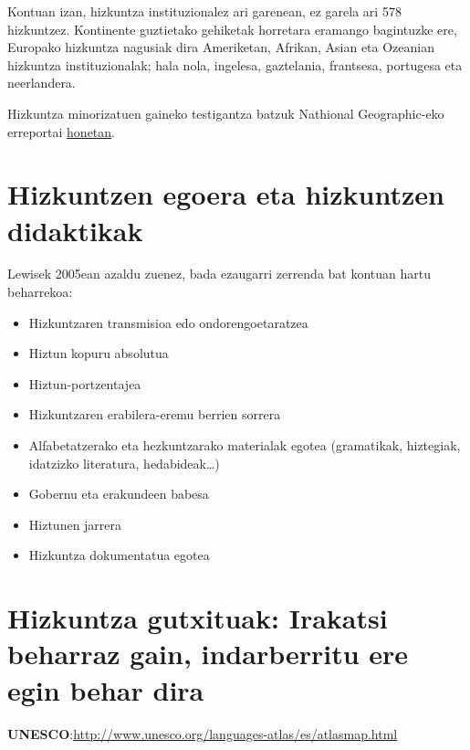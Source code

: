 \documentclass[
]{book}
\providecommand{\tightlist}{%
  \setlength{\itemsep}{0pt}\setlength{\parskip}{0pt}}
\begin{document}
Kontuan izan, hizkuntza instituzionalez ari garenean, ez garela ari 578 hizkuntzez. Kontinente guztietako gehiketak horretara eramango bagintuzke ere, Europako hizkuntza nagusiak dira Ameriketan, Afrikan, Asian eta Ozeanian hizkuntza instituzionalak; hala nola, ingelesa, gaztelania, frantsesa, portugesa eta neerlandera.

Hizkuntza minorizatuen gaineko testigantza batzuk Nathional Geographic-eko erreportai \href{http://www.nationalgeographic.com.es/mundo-ng/grandes-reportajes/lenguas-peligro-extincion_6174/26}{honetan}.

\hypertarget{hizkuntzen-egoera-eta-hizkuntzen-didaktikak}{%
\section{Hizkuntzen egoera eta hizkuntzen didaktikak}\label{hizkuntzen-egoera-eta-hizkuntzen-didaktikak}}

Lewisek 2005ean azaldu zuenez, bada ezaugarri zerrenda bat kontuan hartu beharrekoa:

\begin{itemize}
\tightlist
\item
  Hizkuntzaren transmisioa edo ondorengoetaratzea
\item
  Hiztun kopuru absolutua
\item
  Hiztun-portzentajea
\item
  Hizkuntzaren erabilera-eremu berrien sorrera
\item
  Alfabetatzerako eta hezkuntzarako materialak egotea (gramatikak, hiztegiak, idatzizko literatura, hedabideak\ldots)
\item
  Gobernu eta erakundeen babesa
\item
  Hiztunen jarrera
\item
  Hizkuntza dokumentatua egotea
\end{itemize}

\hypertarget{hizkuntza-gutxituak-irakatsi-beharraz-gain-indarberritu-ere-egin-behar-dira}{%
\section{Hizkuntza gutxituak: Irakatsi beharraz gain, indarberritu ere egin behar dira}\label{hizkuntza-gutxituak-irakatsi-beharraz-gain-indarberritu-ere-egin-behar-dira}}

\textbf{UNESCO}:\url{http://www.unesco.org/languages-atlas/es/atlasmap.html}
\end{document}
